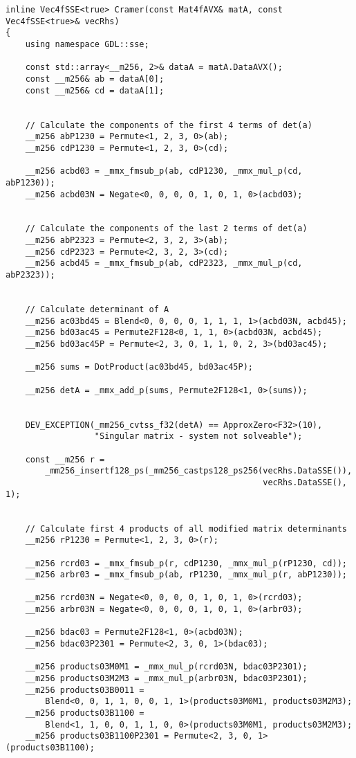 \begin{verbatim}
inline Vec4fSSE<true> Cramer(const Mat4fAVX& matA, const Vec4fSSE<true>& vecRhs)
{
    using namespace GDL::sse;

    const std::array<__m256, 2>& dataA = matA.DataAVX();
    const __m256& ab = dataA[0];
    const __m256& cd = dataA[1];


    // Calculate the components of the first 4 terms of det(a)
    __m256 abP1230 = Permute<1, 2, 3, 0>(ab);
    __m256 cdP1230 = Permute<1, 2, 3, 0>(cd);

    __m256 acbd03 = _mmx_fmsub_p(ab, cdP1230, _mmx_mul_p(cd, abP1230));
    __m256 acbd03N = Negate<0, 0, 0, 0, 1, 0, 1, 0>(acbd03);


    // Calculate the components of the last 2 terms of det(a)
    __m256 abP2323 = Permute<2, 3, 2, 3>(ab);
    __m256 cdP2323 = Permute<2, 3, 2, 3>(cd);
    __m256 acbd45 = _mmx_fmsub_p(ab, cdP2323, _mmx_mul_p(cd, abP2323));


    // Calculate determinant of A
    __m256 ac03bd45 = Blend<0, 0, 0, 0, 1, 1, 1, 1>(acbd03N, acbd45);
    __m256 bd03ac45 = Permute2F128<0, 1, 1, 0>(acbd03N, acbd45);
    __m256 bd03ac45P = Permute<2, 3, 0, 1, 1, 0, 2, 3>(bd03ac45);

    __m256 sums = DotProduct(ac03bd45, bd03ac45P);

    __m256 detA = _mmx_add_p(sums, Permute2F128<1, 0>(sums));


    DEV_EXCEPTION(_mm256_cvtss_f32(detA) == ApproxZero<F32>(10), 
                  "Singular matrix - system not solveable");

    const __m256 r = 
        _mm256_insertf128_ps(_mm256_castps128_ps256(vecRhs.DataSSE()),
                                                    vecRhs.DataSSE(), 1);


    // Calculate first 4 products of all modified matrix determinants
    __m256 rP1230 = Permute<1, 2, 3, 0>(r);

    __m256 rcrd03 = _mmx_fmsub_p(r, cdP1230, _mmx_mul_p(rP1230, cd));
    __m256 arbr03 = _mmx_fmsub_p(ab, rP1230, _mmx_mul_p(r, abP1230));

    __m256 rcrd03N = Negate<0, 0, 0, 0, 1, 0, 1, 0>(rcrd03);
    __m256 arbr03N = Negate<0, 0, 0, 0, 1, 0, 1, 0>(arbr03);

    __m256 bdac03 = Permute2F128<1, 0>(acbd03N);
    __m256 bdac03P2301 = Permute<2, 3, 0, 1>(bdac03);

    __m256 products03M0M1 = _mmx_mul_p(rcrd03N, bdac03P2301);
    __m256 products03M2M3 = _mmx_mul_p(arbr03N, bdac03P2301);
    __m256 products03B0011 = 
        Blend<0, 0, 1, 1, 0, 0, 1, 1>(products03M0M1, products03M2M3);
    __m256 products03B1100 = 
        Blend<1, 1, 0, 0, 1, 1, 0, 0>(products03M0M1, products03M2M3);
    __m256 products03B1100P2301 = Permute<2, 3, 0, 1>(products03B1100);


\end{verbatim}
